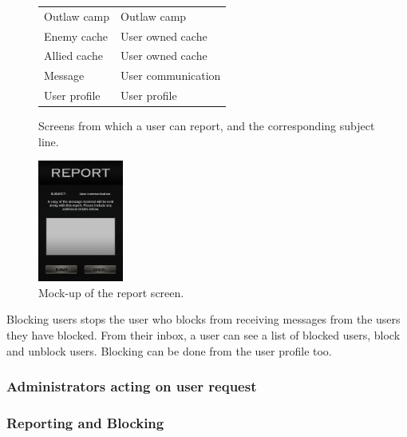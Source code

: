 \begin{figure}[ht]
	\begin{minipage}{0.5\textwidth}
	\begin{tabularx}{\textwidth}{| X | X |}
		\hline
		Outlaw camp & Outlaw camp \\
		Enemy cache & User owned cache \\
		Allied cache & User owned cache \\
		Message & User communication \\
		User profile & User profile \\
		\hline
	\end{tabularx}
	\caption{Screens from which a user can report,
	and the corresponding subject line.}
	\label{report_table}
	\end{minipage}
\end{figure}

\begin{figure}
	\vspace{-180pt}
	\begin{center}
	\includegraphics[width=0.25\textwidth]{images/report_mockup}
	\caption{Mock-up of the report screen.}
	\label{report_mockup}
	\end{center}
	\vspace{-60pt}
\end{figure}

Blocking users stops the user who blocks from receiving messages from the users they have blocked. From their inbox, a user can see a list of blocked users, block and unblock users. Blocking can be done from the user profile too.

\subsubsection{Administrators acting on user request}
\subsubsection{Reporting and Blocking}

